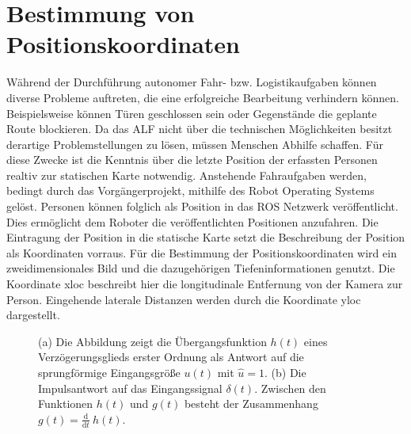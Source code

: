 	
		
		
	\section{Bestimmung von Positionskoordinaten}
	\label{sec: Bestimmung der Positionskoordinaten}
		Während der Durchführung autonomer Fahr- bzw. Logistikaufgaben können diverse Probleme auftreten, die eine erfolgreiche Bearbeitung verhindern können. Beispielsweise können Türen geschlossen sein oder Gegenstände die geplante Route blockieren. Da das ALF nicht über die technischen Möglichkeiten besitzt derartige Problemstellungen zu lösen, müssen Menschen Abhilfe schaffen. Für diese Zwecke ist die Kenntnis über die letzte Position der erfassten Personen realtiv zur statischen Karte  notwendig. Anstehende Fahraufgaben werden, bedingt durch das Vorgängerprojekt, mithilfe des Robot Operating Systems gelöst. Personen können folglich als Position in das ROS Netzwerk veröffentlicht. Dies ermöglicht dem Roboter die veröffentlichten Positionen anzufahren. Die Eintragung der Position in die statische Karte setzt die Beschreibung der Position als Koordinaten vorraus. Für die Bestimmung der Positionskoordinaten wird ein zweidimensionales Bild und die dazugehörigen Tiefeninformationen genutzt. Die Koordinate xloc beschreibt hier die longitudinale Entfernung von der Kamera zur Person. Eingehende laterale Distanzen werden durch die Koordinate yloc dargestellt.
		
	\begin{figure}[H]
		\centering
		
		\caption{(a) Die Abbildung zeigt die Übergangsfunktion $h(t)$ eines Verzögerungsglieds erster Ordnung als Antwort auf die sprungförmige Eingangsgröße $u(t)$ mit $\hat{u}=1$. (b) Die Impulsantwort auf das Eingangssignal $\delta(t)$. Zwischen den Funktionen $h(t)$ und $g(t)$ besteht der Zusammenhang \mbox{$g(t)=\frac{\mathrm d}{\mathrm d t}\:h(t)$}.}
		\label{fig: antworten}
	\end{figure}


	     
	

